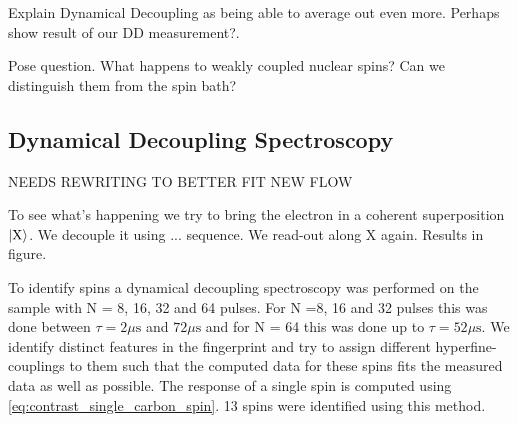 Explain Dynamical Decoupling as being able to average out even more. Perhaps show result of our DD measurement?.

Pose question. What happens to weakly coupled nuclear spins? Can we distinguish them from the spin bath?

\subsection{Dynamical Decoupling Spectroscopy}

NEEDS REWRITING TO BETTER FIT NEW FLOW

To see what's happening we try to bring the electron in a coherent superposition ${\left\vert{\mathrm{X}}\right\rangle}$.
We decouple it using ... sequence. We read-out along X again. Results in figure.

To identify spins a dynamical decoupling spectroscopy was performed on the sample with N = 8, 16, 32 and 64 pulses. For N =8, 16 and 32 pulses this was done between $\tau = 2 \mu \mathrm{s}$  and $72 \mu \mathrm{s}$ and for N = 64 this was done up to $\tau = 52 \mu \mathrm{s}$.
We identify distinct features in the fingerprint and try to assign different hyperfine-couplings to them such that the computed data for these spins fits the measured data as well as possible.
The response of a single spin is computed using \cref{eq:contrast_single_carbon_spin}.
13 spins were identified using this method.


